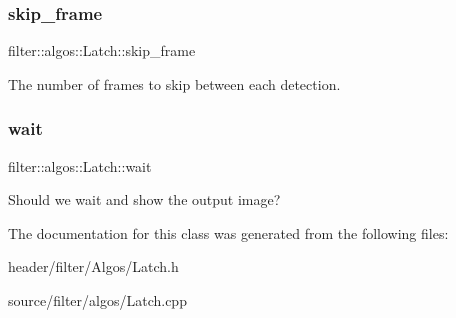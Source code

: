 \subsubsection{\texorpdfstring{skip\+\_\+frame}{skip\_frame}}
{\footnotesize\ttfamily filter\+::algos\+::\+Latch\+::skip\+\_\+frame}

The number of frames to skip between each detection. \mbox{\label{classfilter_1_1algos_1_1_latch_ad222b305aea19321304e329cf60aaf65}} 
\subsubsection{\texorpdfstring{wait}{wait}}
{\footnotesize\ttfamily filter\+::algos\+::\+Latch\+::wait}

Should we wait and show the output image? 

The documentation for this class was generated from the following files\+:\begin{DoxyCompactItemize}
\item 
header/filter/\+Algos/Latch.\+h\item 
source/filter/algos/Latch.\+cpp\end{DoxyCompactItemize}
